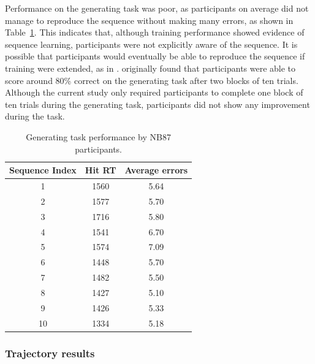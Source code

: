 \documentclass[man,floatsintext]{apa6}
\begin{document}
Performance on the generating task was poor, as participants on average did not manage to reproduce the sequence without making many errors, as shown in Table~\ref{test-table}. This indicates that, although training performance showed evidence of sequence learning, participants were not explicitly aware of the sequence. It is possible that participants would eventually be able to reproduce the sequence if training were extended, as in .  originally found that participants were able to score around 80\% correct on the generating task after two blocks of ten trials. Although the current study only required participants to complete one block of ten trials during the generating task, participants did not show any improvement during the task. 


\begin{table}[h]
\begin{center} 
\caption{Generating task performance by NB87 participants.} 
\label{test-table} 
\vskip 0.12in
\begin{tabular}{c c c} 
\hline
Sequence Index  &  Hit RT  &  Average errors  \\ %
\hline
1  &  1560 &  5.64  \\
2  &  1577 &  5.70  \\
3  &  1716 &  5.80  \\
4  &  1541 &  6.70  \\ 
5  &  1574 &  7.09  \\ 
6  &  1448 &  5.70  \\ 
7  &  1482 &  5.50  \\ 
8  &  1427 &  5.10  \\ 
9  &  1426 &  5.33  \\ 
10 & 1334 &  5.18  \\
\hline
\end{tabular} 
\end{center} 
\end{table} 


\subsubsection{Trajectory results}
\end{document}
